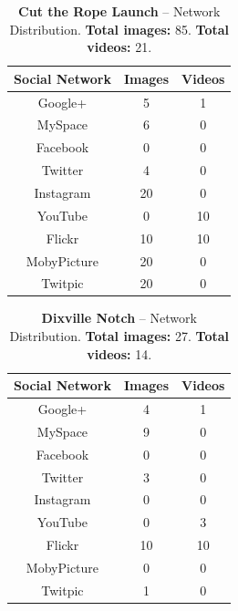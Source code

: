 \documentclass{acm_proc_article-sp}
\begin{document}
\begin{table}[htbp]
  \begin{tabular}{ | c | c | c | }
    \hline
    \textbf{Social Network} & \textbf{Images} & \textbf{Videos}\\
    \hline
    Google+ & 5 & 1\\
    MySpace & 6 & 0\\
    Facebook & 0 & 0\\
    Twitter & 4 & 0\\
    Instagram & 20 & 0\\
    YouTube & 0 & 10\\
    Flickr & 10 & 10\\ 
    MobyPicture & 20 & 0\\
    Twitpic & 20 & 0\\
    \hline
  \end{tabular}
  \label{tab:rope}
  \caption{\textbf{Cut the Rope Launch} -- Network Distribution. \textbf{Total images:} 85. \textbf{Total videos:} 21.}
\end{table}

\begin{table}[htbp]
  \begin{tabular}{ | c | c | c | }
    \hline
    \textbf{Social Network} & \textbf{Images} & \textbf{Videos}\\
    \hline
    Google+ & 4 & 1\\
    MySpace & 9 & 0\\
    Facebook & 0 & 0\\
    Twitter & 3 & 0\\
    Instagram & 0 & 0\\
    YouTube & 0 & 3\\
    Flickr & 10 & 10\\ 
    MobyPicture & 0 & 0\\
    Twitpic & 1 & 0\\
    \hline
  \end{tabular}
  \label{tab:dixville}
  \caption{\textbf{Dixville Notch} -- Network Distribution. \textbf{Total images:} 27. \textbf{Total videos:} 14.}
\end{table}
\end{document}
